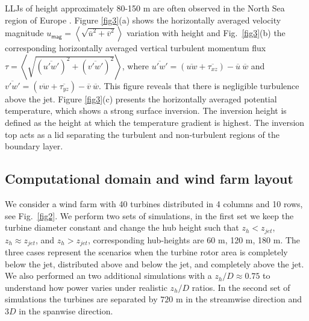 \documentclass[%
 aip,
 amsmath,amssymb,
preprint,%
author-numerical,%
]{revtex4-1}
\begin{document}
\indent LLJs of height approximately 80-150 m are often observed in the North Sea region of Europe \cite{baa09}. Figure \ref{fig3}(a) shows the horizontally averaged velocity magnitude $u_\mathsf{mag}=\left<\sqrt{\overline{u}^2+\overline{v}^2}\right>$ variation with height and Fig.\ \ref{fig3}(b) the corresponding horizontally averaged vertical turbulent momentum flux $\tau=\left<\sqrt{(\overline{u'w'})^2 + (\overline{v'w'})^2}\right>$, where $\overline{u'w'}=\left(\overline{{uw}} + \overline{\tau_{xz}}\right)-\overline{{u}}~\overline{{w}}$ and $\overline{v'w'}=\left(\overline{{vw}} + \overline{\tau_{yz}}\right)-\overline{{v}}~\overline{{w}}$. This figure reveals that there is negligible turbulence above the jet. Figure \ref{fig3}(c) presents the horizontally averaged potential temperature, which shows a strong surface inversion. The inversion height is defined as the height at which the temperature gradient is highest. The inversion top acts as a lid separating the turbulent and non-turbulent regions of the boundary layer.


\subsection{Computational domain and wind farm layout}\label{sec2.3} 
We consider a wind farm with 40 turbines distributed in 4 columns and 10 rows, see Fig.\ \ref{fig2}. We perform two sets of simulations, in the first set we keep the turbine diameter constant and change the hub height such that $z_h<z_{jet}$, $z_h\approx{z_{jet}}$, and $z_h>z_{jet}$, corresponding hub-heights are 60 m, 120 m, 180 m. The three cases represent the scenarios when the turbine rotor area is completely below the jet, distributed above and below the jet, and completely above the jet. We also performed an two additional simulations with a $z_h/D\approx0.75$ to understand how power varies under realistic $z_h/D$ ratios. In the second set of simulations the turbines are separated by $720$ m in the streamwise direction and $3D$ in the spanwise direction. 
\end{document}
